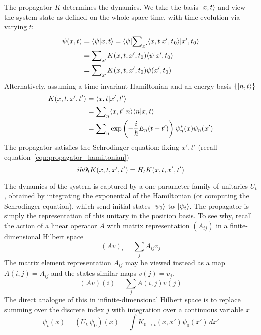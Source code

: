 The propagator $K$ determines the dynamics. We take the basis $|x, t\rangle$ 
and view the system state as defined on the whole space-time, with time evolution via varying $t$: 
\begin{equation}\begin{aligned}\label{eqn:propagator_evolution}
    \psi(x, t) 
        &= \left\langle \psi|x, t \right\rangle = \langle \psi|{\sum}_{x'}\langle x, t|x', t_0\rangle |x', t_0\rangle  \\ 
        &= {\sum}_{x'}K(x, t, x', t_0)\langle \psi|x', t_0\rangle \\ 
        &= {\sum}_{x'}K(x, t, x', t_0)\psi(x', t_0)
\end{aligned}\end{equation}
Alternatively, assuming a time-invariant Hamiltonian and an energy basis $\{|n, t\rangle\}$
\begin{equation}\begin{aligned}\label{eqn:propagator_energy_eigenstates}
    K(x, t, x', t') 
        &= \langle x, t|x', t'\rangle \\ 
        &= {\sum}_n \langle x, t'|n\rangle \langle n|x, t\rangle \\ 
        &= {\sum}_n \exp\left(-\dfrac i {\hbar} E_n(t-t')\right)\psi_n^*(x)\psi_n(x')
\end{aligned}\end{equation}
The propagator satisfies the Schrodinger equation: fixing $x', t'$ (recall equation~\ref{eqn:propagator_hamiltonian})
\begin{equation}
    i\hbar \partial_{t} K(x, t, x', t') = H_t K(x, t, x', t')
\end{equation}
\begin{remark}
    The dynamics of the system is captured by a one-parameter family of unitaries $U_t$, 
    obtained by integrating the exponential of the Hamiltonian (or computing the Schrodinger 
    equation), which send initial states $|\psi_0\rangle$ to $|\psi_t\rangle$. 
    The propagator is simply the representation of this unitary in the position basis. 
    To see why, recall the action of a linear operator $A$ with matrix representation $(A_{ij})$ 
    in a finite-dimensional Hilbert space 
    \[ 
        (Av)_i = \sum_j A_{ij} v_j 
    \] 
    The matrix element representation $A_{ij}$ may be viewed instead as a map $A(i, j)=A_{ij}$ 
    and the states similar maps $v(j) = v_j$. 
    \[ 
        (Av)(i) = \sum_j A(i, j)v(j)
    \] 
    The direct analogue of this in infinite-dimensional Hilbert space is to replace summing 
    over the discrete index $j$ with integration over a continuous variable $x$ 
    \[ 
        \psi_t(x) = (U_t\, \psi_0)(x) = \int K_{0\to t}(x, x')\psi_0(x')\, dx' 
    \] 
\end{remark}

